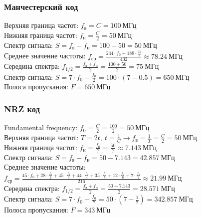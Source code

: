 \documentclass[12pt,onecolumn]{article}
\begin{document}
\subsubsection{Манчестерский код}
Верхняя граница частот: $f_{\text{в}} = C = 100~ \text{МГц}$\\
Нижняя граница частот: $f_{\text{н}} = \frac{C}{2} = 50~ \text{МГц}$\\
Спектр сигнала: $S = f_{\text{в}} - f_{\text{н}} = 100 - 50 = 50~\text{МГц}$\\
Среднее значение частоты: $f_{\text{ср}} =  \frac{244\cdot f_0 + 188 \cdot \frac{f_0}{2}}{432} \approx 78.24~\text{МГц}$\\
Середина спектра: $f_{1/2} = \frac{f_{\text{в}} + f_{\text{н}}}{2} = \frac{100 + 50}{2} = 75~\text{МГц}$\\
Спектр сигнала: $S = 7\cdot f_0 - \frac{f_0}{2} = 100 \cdot (7 - 0.5)= 650~\text{МГц}$\\
Полоса пропускания: $F = 650~ \text{МГц}$
\subsubsection{NRZ код}
Fundamental frequency: $f_{\text{0}} = \frac{C}{2} = \frac{100}{2} = 50~\text{МГц}$\\
Верхняя граница частот: $T = 2t, ~t = \frac{1}{C} \to f_{\text{в}} = \frac{1}{T} = \frac{C}{2} = 50~\text{МГц}$\\
Нижняя граница частот: $f_{\text{н}} = \frac{f_{\text{0}}}{7} = \frac{50}{7} \approx 7.143~\text{МГц}$\\
Спектр сигнала: $S = f_{\text{в}} - f_{\text{н}} = 50 - 7.143 = 42.857 ~\text{МГц}$\\
Среднее значение частоты: $f_{\text{ср}} = \frac{45\cdot f_0 + 28 \cdot \frac{f_0}{2} + 45 \cdot \frac{f_0}{3} + 44 \cdot \frac{f_0}{4} + 35 \cdot \frac{f_0}{5} + 12 \cdot \frac{f_0}{6} + 7 \cdot \frac{f_0}{7}}{216} \approx 21.99~\text{МГц}$\\
Середина спектра: $f_{1/2} = \frac{f_{\text{в}} + f_{\text{н}}}{2} = \frac{50 + 7.143}{2} = 28.571~\text{МГц}$\\
Спектр сигнала: $S = 7\cdot f_0 - \frac{f_0}{7} = 50 \cdot \left(7 -\frac{1}{7}\right) = 342.857 ~\text{МГц}$\\
Полоса пропускания: $F = 343~ \text{МГц}$
\end{document}
